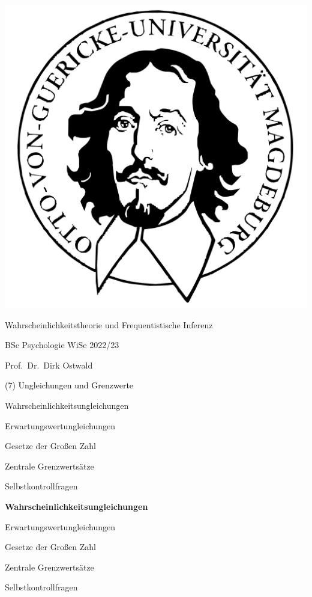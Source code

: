 \documentclass[
  8pt,
  ignorenonframetext,
]{beamer}
\author{}
\date{\vspace{-2.5em}}
\begin{document}
\begin{frame}[plain]{}
\protect\hypertarget{section}{}
\center

\begin{center}\includegraphics[width=0.2\linewidth]{7_Abbildungen/wtfi_7_otto} \end{center}

\vspace{2mm}

\Large

Wahrscheinlichkeitstheorie und Frequentistische Inferenz \vspace{6mm}

\large

BSc Psychologie WiSe 2022/23

\vspace{6mm}
\large

Prof.~Dr.~Dirk Ostwald
\end{frame}

\begin{frame}[plain]{}
\protect\hypertarget{section-1}{}
\vfill
\center
\huge

\textcolor{black}{(7) Ungleichungen und Grenzwerte} \vfill
\end{frame}

\begin{frame}{}
\protect\hypertarget{section-2}{}
\large
\vfill
{}

Wahrscheinlichkeitsungleichungen

Erwartungswertungleichungen

Gesetze der Großen Zahl

Zentrale Grenzwertsätze

Selbstkontrollfragen \vfill
\end{frame}

\begin{frame}{}
\protect\hypertarget{section-3}{}
\large
\vfill
{}

\textbf{Wahrscheinlichkeitsungleichungen}

Erwartungswertungleichungen

Gesetze der Großen Zahl

Zentrale Grenzwertsätze

Selbstkontrollfragen \vfill
\end{frame}
\end{document}
